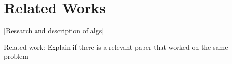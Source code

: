 \section{Related Works}
[Research and description of algs]

Related work: Explain if there is a relevant paper that worked on the same problem

